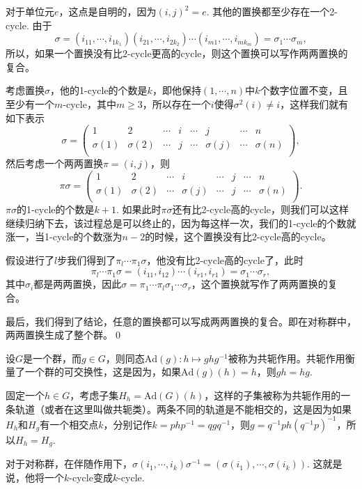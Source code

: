 \documentclass[10pt]{article}
\begin{document}
\proof 对于单位元$e$，这点是自明的，因为$(i,j)^2=e$. 其他的置换都至少存在一个2-cycle. 由于
\[
	\sigma=(i_{11},\cdots,i_{1k_1})(i_{21},\cdots,i_{2k_2})\cdots (i_{m1},\cdots,i_{mk_m})=\sigma_1 \cdots \sigma_m,
\]
所以，如果一个置换没有比$2$-cycle更高的cycle，则这个置换可以写作两两置换的复合。

考虑置换$\sigma$，他的1-cycle的个数是$k$，即他保持$(1,\cdots,n)$中$k$个数字位置不变，且至少有一个$m$-cycle，其中$m\geq 3$，所以存在一个$i$使得$\sigma^2(i)\neq i$，这样我们就有如下表示
\[
	\sigma=\begin{pmatrix}
	1&2&\cdots&i&\cdots &j&\cdots&n\\
	\sigma(1)&\sigma(2)&\cdots&j&\cdots &\sigma(j)&\cdots&\sigma(n)\\
	\end{pmatrix},
\]
然后考虑一个两两置换$\pi=(i,j)$，则
\[
	\pi\sigma=\begin{pmatrix}
	1&2&\cdots&i&\cdots &j&\cdots&n\\
	\sigma(1)&\sigma(2)&\cdots&\sigma(j)&\cdots &j&\cdots&\sigma(n)\\
	\end{pmatrix}.
\]
$\pi\sigma$的1-cycle的个数是$k+1$. 如果此时$\pi\sigma$还有比2-cycle高的cycle，则我们可以这样继续归纳下去，该过程总是可以终止的，因为每这样一次，我们的1-cycle的个数就涨一，当1-cycle的个数涨为$n-2$的时候，这个置换没有比2-cycle高的cycle。

假设进行了$l$步我们得到了$\pi_l\cdots\pi_1 \sigma$，他没有比2-cycle高的cycle了，此时
\[
\pi_l\cdots\pi_1 \sigma=(i_{11},i_{12}) \cdots  (i_{r1},i_{r1})=\sigma_1 \cdots  \sigma_r,
\]
其中$\sigma_i$都是两两置换，因此$\sigma=\pi_1\cdots\pi_l\sigma_1\cdots \sigma_r$，这个置换就写作了两两置换的复合。

最后，我们得到了结论，任意的置换都可以写成两两置换的复合。即在对称群中，两两置换生成了整个群。\qed

\para 设$G$是一个群，而$g\in G$，则同态$\mathrm{Ad}(g):h\mapsto ghg^{-1}$被称为共轭作用。共轭作用衡量了一个群的可交换性，这是因为，如果$\mathrm{Ad}(g)(h)=h$，则$gh=hg$.

固定一个$h\in G$，考虑子集$H_h=\mathrm{Ad}(G)(h)$，这样的子集被称为共轭作用的一条轨道（或者在这里叫做共轭类）。两条不同的轨道是不能相交的，这是因为如果$H_h$和$H_g$有一个相交点$k$，分别记作$k=php^{-1}=qgq^{-1}$，则$g=q^{-1}ph(q^{-1}p)^{-1}$，所以$H_h=H_g$.

\pro 对于对称群，在伴随作用下，$\sigma (i_1,\cdots,i_k)\sigma^{-1}= (\sigma(i_1),\cdots,\sigma(i_k))$. 
这就是说，他将一个$k$-cycle变成$k$-cycle.
\end{document}
